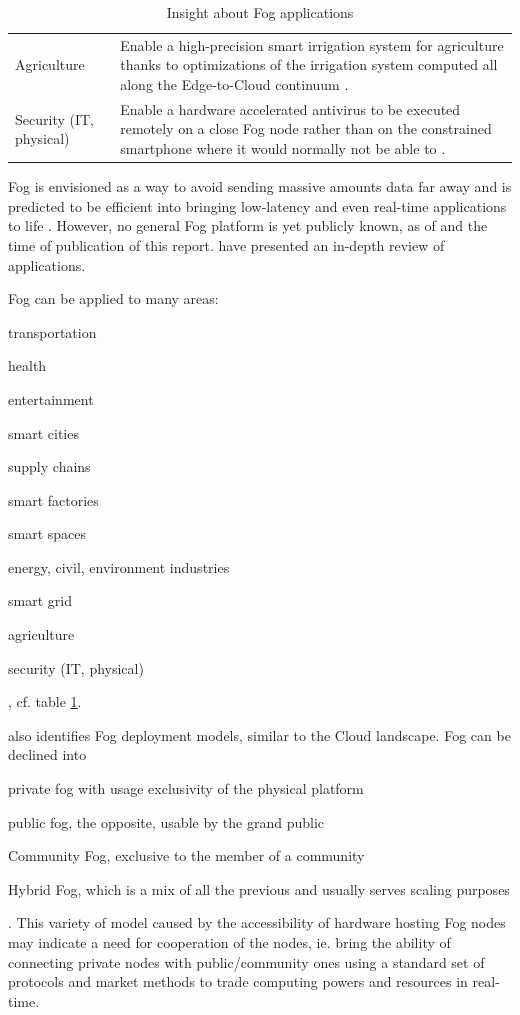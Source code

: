 \documentclass[11pt]{sdm}
\begin{document}
\begin{table}[t]
\begin{tabular}{|p{3cm}|p{12cm}|}
		\\
		Agriculture 
		& Enable a high-precision smart irrigation system for agriculture thanks to optimizations of the irrigation system computed all along the Edge-to-Cloud continuum \cite{noauthor_swamp_nodate}.
		\\
		Security (IT, physical) 
		& Enable a hardware accelerated antivirus to be executed remotely on a close Fog node rather than on the constrained smartphone where it would normally not be able to \cite{deyannis_enabling_2018}.
		\\
		\hline
	\end{tabular}
	\caption{\label{tab:applications}Insight about Fog applications \cite{ahmed_fog_2019}}
\end{table}

Fog is envisioned as a way to avoid sending massive amounts data far away and is predicted to be efficient into bringing low-latency and even real-time applications to life \cite{ahmed_fog_2019}. However, no general Fog platform is yet publicly known, as of  and the time of publication of this report. \citet{ahmed_fog_2019} have presented an in-depth review of applications.


Fog can be applied to many areas:
\begin{enumerate*}[(a)]
	\item transportation
	\item health
	\item entertainment
	\item smart cities
	\item supply chains
	\item smart factories
	\item smart spaces
	\item energy, civil, environment industries
	\item smart grid
	\item agriculture
	\item security (IT, physical)
\end{enumerate*}, cf. table \ref{tab:applications}.

\cite{ahmed_fog_2019} also identifies Fog deployment models, similar to the Cloud landscape. Fog can be declined into
\begin{enumerate*}
	\item private fog with usage exclusivity of the physical platform
	\item public fog, the opposite, usable by the grand public
	\item Community Fog, exclusive to the member of a community
	\item Hybrid Fog, which is a mix of all the previous and usually serves scaling purposes
\end{enumerate*}. This variety of model caused by the accessibility of hardware hosting Fog nodes may indicate a need for cooperation of the nodes, ie. bring the ability of connecting private nodes with public/community ones using a standard set of protocols and market methods to trade computing powers and resources in real-time.
\end{document}
